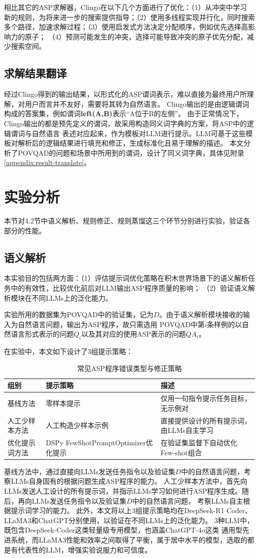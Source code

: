 相比其它的ASP求解器，Clingo在以下几个方面进行了优化：（1）从冲突中学习
新的规则，为将来进一步的搜索提供指导；（2）使用多线程实现并行化，同时搜索
多个路径，加速求解过程；（3）使用启发式方法决定分配顺序，例如优先选择高影响力的原子；
（4）预测可能发生的冲突，选择可能导致冲突的原子优先分配，减少搜索空间。
\subsection{求解结果翻译}
经过Clingo得到的输出结果，以形式化的ASP谓词表示，难以直接为最终用户所理解，对用户而言并不友好，需要将其转为自然语言。
Clingo输出的是由逻辑谓词构成的答案集，例如谓词\textbf{left(A,B)}表示“A位于B的左侧”。
由于正常情况下，Clingo输出的都是预先定义的谓词，故采用构造同义词字典的方案，将ASP中的逻辑谓词与自然语言
表述对应起来，作为模板对LLM进行提示。LLM可基于这些模板对解析后的逻辑结果进行填充和修正，生成标准化且易于理解的描述。
本文分析了POVQAD的问题和场景中所用到的谓词，设计了同义词字典，具体见附录\ref{appendix:result-translate}。
\section{实验分析}
本节对4.2节中语义解析、规则修正、规则蒸馏这三个环节分别进行实验，验证各部分的性能。
\subsection{语义解析}
本实验目的包括两方面：（1）评估提示词优化策略在积木世界场景下的语义解析任务中的有效性，比较优化前后对LLM输出ASP程序质量的影响；
（2）验证语义解析模块在不同LLMs上的泛化能力。

实验所用的数据集为POVQAD中的验证集，记为$D$。由于语义解析模块接收的输入为自然语言问题，输出为ASP程序，故只需选用
POVQAD中第$i$条样例的以自然语言形式表示的问题$Q_i$以及其对应的使用ASP表示的问题$QA_i$。

在实验中，本文如下设计了3组提示策略：
\begin{table}[H]
\centering
\caption{常见ASP程序错误类型与修正策略}
\begin{tabular}{|l|p{5.5cm}|p{5.5cm}|}
\hline
\textbf{组别} & \textbf{提示策略} & \textbf{描述} \\
\hline
基线方法 & 零样本提示 & 仅用一句指令提示任务目标，无示例对 \\
\hline
人工少样本方法 & 人工构造少样本示例 & 直接提供设计的所有提示词，由LLMs自主学习 \\
\hline
优化提示词方法 & DSPy FewShotPromptOptimizer优化提示 & 在验证集监督下自动优化Few-shot组合 \\
\hline
\end{tabular}
\end{table}
基线方法中，通过直接向LLMs发送任务指令以及验证集$D$中的自然语言问题，考察LLMs自身固有的根据问题生成ASP程序的能力。
人工少样本方法中，首先向LLMs发送人工设计的所有提示词，并指示LLMs学习如何进行ASP程序生成。随后，再向LLMs发送任务指令以及验证集$D$中的自然语言问题，
考察LLMs自主根据提示词学习的能力。
此外，本文将以上3组提示策略均在DeepSeek-R1 Coder、LLaMA3和ChatGPT分别使用，以验证在不同LLMs上的泛化能力。
3种LLM中，既包含DeepSeek-Coder这类轻量级专用模型，也涵盖ChatGPT-4o这类
通用型先进系统，而LLaMA3性能和效率之间取得了平衡，属于居中水平的模型，选取的都是有代表性的LLM，增强实验说服力和可信度。

